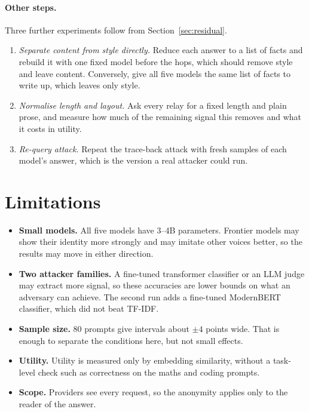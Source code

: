 \documentclass[11pt]{article}
\begin{document}
\paragraph{Other steps.} Three further experiments follow from Section~\ref{sec:residual}.
\begin{enumerate}
  \item \emph{Separate content from style directly.} Reduce each answer to a list of facts and rebuild it with one fixed model before the hops, which should remove style and leave content. Conversely, give all five models the same list of facts to write up, which leaves only style.
  \item \emph{Normalise length and layout.} Ask every relay for a fixed length and plain prose, and measure how much of the remaining signal this removes and what it costs in utility.
  \item \emph{Re-query attack.} Repeat the trace-back attack with fresh samples of each model's answer, which is the version a real attacker could run.
\end{enumerate}

\section{Limitations}

\begin{itemize}
  \item \textbf{Small models.} All five models have 3--4B parameters. Frontier models may show their identity more strongly and may imitate other voices better, so the results may move in either direction.
  \item \textbf{Two attacker families.} A fine-tuned transformer classifier or an LLM judge may extract more signal, so these accuracies are lower bounds on what an adversary can achieve. The second run adds a fine-tuned ModernBERT classifier, which did not beat TF-IDF.
  \item \textbf{Sample size.} 80 prompts give intervals about $\pm 4$ points wide. That is enough to separate the conditions here, but not small effects.
  \item \textbf{Utility.} Utility is measured only by embedding similarity, without a task-level check such as correctness on the maths and coding prompts.
  \item \textbf{Scope.} Providers see every request, so the anonymity applies only to the reader of the answer.
\end{itemize}
\end{document}
